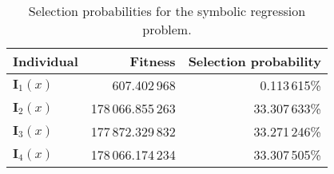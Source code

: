 \begin{table}[ht!]
  \centering
  \begin{tabular}{|l|r|r|}
    \hline
    \textbf{Individual}	& \textbf{Fitness}	& \textbf{Selection probability}	\\
    \hline
    \(\mathbf{I}_1(x)\)	& 607.402\,968	& 0.113\,615\%	\\
    \(\mathbf{I}_2(x)\)	& 178\,066.855\,263	& 33.307\,633\%	\\
    \(\mathbf{I}_3(x)\)	& 177\,872.329\,832	& 33.271\,246\%	\\
    \(\mathbf{I}_4(x)\)	& 178\,066.174\,234	& 33.307\,505\%	\\
    \hline
  \end{tabular}
  \caption{Selection probabilities for the symbolic regression problem.}
  \label{tab:bg:gp:sel:prob}
\end{table}